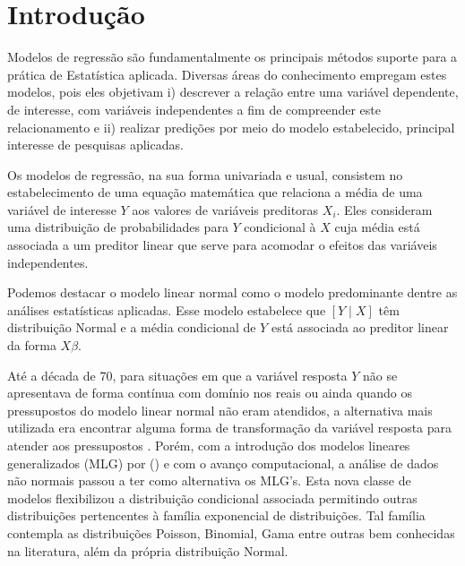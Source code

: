 \documentclass[
12pt,				%
openright,			%
oneside,			%
a4paper,			%
english,			%
brazil,				%
]{abntex2}
\begin{document}

\imprimirfolhaderosto

\tableofcontents*
\cleardoublepage


\textual

\chapter{Introdução}
\label{cha:introducao}

Modelos de regressão são fundamentalmente os principais
métodos suporte para a prática de Estatística aplicada. Diversas áreas
do conhecimento empregam estes modelos, pois eles objetivam
i) descrever a relação entre uma variável dependente, de interesse, com
variáveis independentes a fim de compreender este relacionamento e ii)
realizar predições por meio do modelo estabelecido, principal interesse
de pesquisas aplicadas.

Os modelos de regressão, na sua forma univariada e usual,
consistem no estabelecimento de uma equação matemática que relaciona a
média de uma
variável de interesse $Y$ aos valores de variáveis preditoras $X_i$.
Eles consideram uma distribuição de probabilidades para $Y$ condicional
à $X$ cuja média está associada a um preditor linear que serve para
acomodar o efeitos das variáveis independentes.

Podemos destacar o modelo linear normal como o
modelo predominante dentre as análises estatísticas aplicadas.
Esse modelo estabelece que $[Y \mid X]$ têm distribuição Normal
e a média condicional de $Y$ está associada ao preditor linear da forma
$X\beta$.

Até a
década de 70, para situações em que a variável resposta $Y$ não se
apresentava de forma contínua com domínio nos reais ou ainda quando os
pressupostos do modelo linear normal não eram atendidos, a alternativa
mais utilizada era
encontrar alguma forma de transformação da variável resposta para
atender aos pressupostos \cite{Paula2013}. Porém, com a introdução dos
modelos lineares generalizados (MLG) por
 (\citeyear{Nelder1972}) e com o avanço
computacional, a análise de dados não normais passou a ter
como alternativa os MLG's. Esta nova classe de modelos flexibilizou a 
distribuição condicional associada permitindo outras distribuições
pertencentes à família exponencial de distribuições. Tal família
contempla as distribuições Poisson, Binomial, Gama entre outras bem
conhecidas na literatura, além da própria distribuição Normal. 
\end{document}
